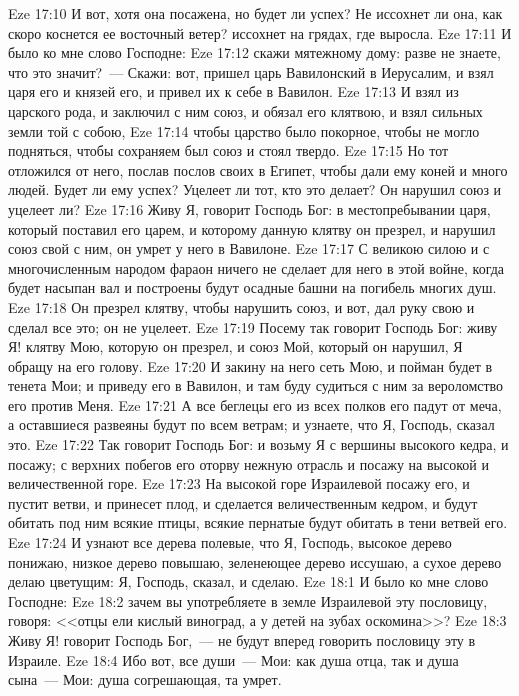 \vs Eze 17:10 И вот, хотя она посажена, но будет ли успех? Не иссохнет ли она, как скоро коснется ее восточный ветер? иссохнет на грядах, где выросла.
\vs Eze 17:11 И было ко мне слово Господне:
\vs Eze 17:12 скажи мятежному дому: разве не знаете, что это значит?~--- Скажи: вот, пришел царь Вавилонский в Иерусалим, и взял царя его и князей его, и привел их к себе в Вавилон.
\vs Eze 17:13 И взял  из царского рода, и заключил с ним союз, и обязал его клятвою, и взял сильных земли той с собою,
\vs Eze 17:14 чтобы царство было покорное, чтобы не могло подняться, чтобы сохраняем был союз и стоял твердо.
\vs Eze 17:15 Но тот отложился от него, послав послов своих в Египет, чтобы дали ему коней и много людей. Будет ли ему успех? Уцелеет ли тот, кто это делает? Он нарушил союз и уцелеет ли?
\vs Eze 17:16 Живу Я, говорит Господь Бог: в местопребывании царя, который поставил его царем, и которому данную клятву он презрел, и нарушил союз свой с ним, он умрет у него в Вавилоне.
\vs Eze 17:17 С великою силою и с многочисленным народом фараон ничего не сделает для него в этой войне, когда будет насыпан вал и построены будут осадные башни на погибель многих душ.
\vs Eze 17:18 Он презрел клятву, чтобы нарушить союз, и вот, дал руку свою и сделал все это; он не уцелеет.
\vs Eze 17:19 Посему так говорит Господь Бог: живу Я! клятву Мою, которую он презрел, и союз Мой, который он нарушил, Я обращу на его голову.
\vs Eze 17:20 И закину на него сеть Мою, и пойман будет в тенета Мои; и приведу его в Вавилон, и там буду судиться с ним за вероломство его против Меня.
\vs Eze 17:21 А все беглецы его из всех полков его падут от меча, а оставшиеся развеяны будут по всем ветрам; и узнаете, что Я, Господь, сказал это.
\vs Eze 17:22 Так говорит Господь Бог: и возьму Я с вершины высокого кедра, и посажу; с верхних побегов его оторву нежную отрасль и посажу на высокой и величественной горе.
\vs Eze 17:23 На высокой горе Израилевой посажу его, и пустит ветви, и принесет плод, и сделается величественным кедром, и будут обитать под ним всякие птицы, всякие пернатые будут обитать в тени ветвей его.
\vs Eze 17:24 И узнают все дерева полевые, что Я, Господь, высокое дерево понижаю, низкое дерево повышаю, зеленеющее дерево иссушаю, а сухое дерево делаю цветущим: Я, Господь, сказал, и сделаю.
\vs Eze 18:1 И было ко мне слово Господне:
\vs Eze 18:2 зачем вы употребляете в земле Израилевой эту пословицу, говоря: <<отцы ели кислый виноград, а у детей на зубах оскомина>>?
\vs Eze 18:3 Живу Я! говорит Господь Бог,~--- не будут вперед говорить пословицу эту в Израиле.
\vs Eze 18:4 Ибо вот, все души~--- Мои: как душа отца, так и душа сына~--- Мои: душа согрешающая, та умрет.
